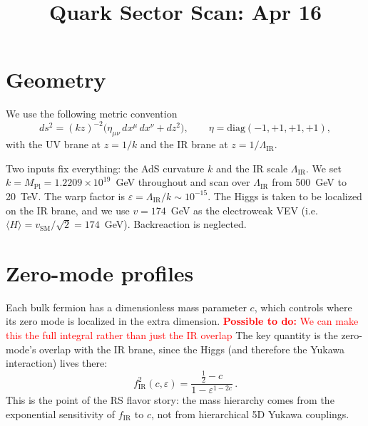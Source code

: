 \documentclass[11pt]{article}
\title{Quark Sector Scan: Apr 16}
\author{}
\date{}
\newcommand{\LamIR}{\Lambda_{\mathrm{IR}}}
\newcommand{\Mpl}{M_{\mathrm{Pl}}}
\begin{document}
\maketitle

\begin{center}
\setlength{\fboxsep}{8pt}
\end{center}

\section{Geometry}

We use the following metric convention
\begin{equation}
  ds^2 = (kz)^{-2}\bigl(\eta_{\mu\nu}\,dx^\mu\,dx^\nu + dz^2\bigr),
  \qquad \eta = \mathrm{diag}(-1,+1,+1,+1),
\end{equation}
with the UV brane at $z = 1/k$ and the IR brane at $z = 1/\LamIR$.

Two inputs fix everything: the AdS curvature $k$ and the IR scale $\LamIR$.
We set $k = \Mpl = 1.2209\times10^{19}$~GeV throughout and scan over $\LamIR$
from 500~GeV to 20~TeV. The warp factor is $\varepsilon = \LamIR / k \sim
10^{-15}$. The Higgs is taken to be localized on the IR brane, and we use
$v = 174$~GeV as the electroweak VEV (i.e.\ $\langle H \rangle =
v_{\mathrm{SM}}/\sqrt{2} = 174$~GeV). Backreaction is neglected.


\section{Zero-mode profiles}

Each bulk fermion has a dimensionless mass parameter $c$, which
controls where its zero mode is localized in the extra dimension. 
\textcolor{red}{\textbf{Possible to do:} We can make this the full integral rather than just the IR overlap}
The key
quantity is the zero-mode's overlap with the IR brane, since the Higgs
(and therefore the Yukawa interaction) lives there:
\begin{equation}
  f_{\mathrm{IR}}^2(c,\varepsilon)
    = \frac{\tfrac{1}{2} - c}{1 - \varepsilon^{1-2c}}\,.
\end{equation}
This is the point of the RS flavor story: the mass hierarchy comes from the
exponential sensitivity of $f_{\mathrm{IR}}$ to $c$, not from hierarchical
5D Yukawa couplings.
\end{document}
